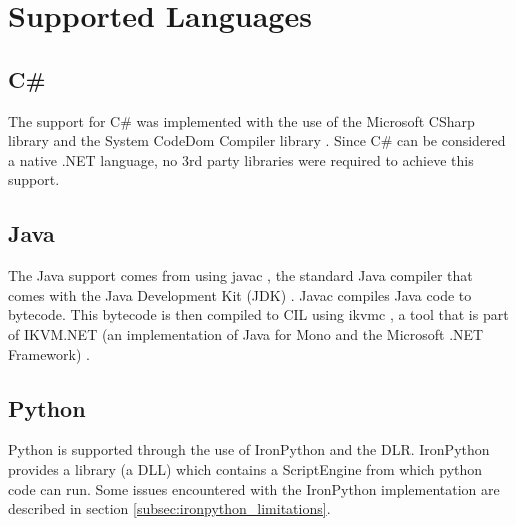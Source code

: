 \section{Supported Languages}

\subsection{C\#}
The support for C\# was implemented with the use of the Microsoft CSharp library \cite{MicrosoftCSharp} and the System CodeDom Compiler library \cite{CodeDomCompiler}. Since C\# can be considered a native .NET language, no 3rd party libraries were required to achieve this support.

\subsection{Java}
The Java support comes from using javac \cite{Javac}, the standard Java compiler that comes with the Java Development Kit (JDK) \cite{JDK}. Javac compiles Java code to bytecode. This bytecode is then compiled to CIL using ikvmc \cite{IKVMC}, a tool that is part of IKVM.NET (an implementation of Java for Mono and the Microsoft .NET Framework) \cite{IKVM.NET}.

\subsection{Python}
Python is supported through the use of IronPython \cite{IronPython} and the DLR. IronPython provides a library (a DLL) which contains a ScriptEngine from which python code can run. Some issues encountered with the IronPython implementation are described in section \ref{subsec:ironpython_limitations}.
